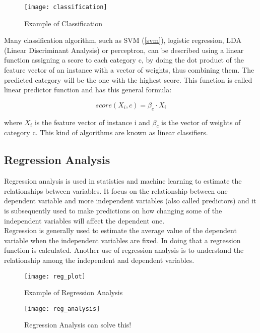 \begin{figure}[H]
	\centering
	\texttt{[image: classification]}
	\caption{Example of Classification \cite{}}
	\label{fig:classification}
\end{figure}	

Many classification algorithm, such as SVM (\ref{svm}), logistic regression, LDA (Linear Discriminant Analysis) or perceptron, can be described using a linear function assigning a score to each category c, by doing the dot product of the feature vector of an instance with a vector of weights, thus combining them. The predicted category will be the one with the highest score. This function is called linear predictor function and has this general formula:

\begin{equation}
score(X_i, c) = \beta_c \cdot X_i
\end{equation}

where $X_i$ is the feature vector of instance i and $\beta_c$ is the vector of weights of category c. This kind of algorithms are known as linear classifiers.

\subsection{Regression Analysis} \label{regression}
Regression analysis is used in statistics and machine learning to estimate the relationships between variables. It focus on the relationship between one dependent variable and more independent variables (also called predictors) and it is subsequently used to make predictions on how changing some of the  independent variables will affect the dependent one. \cite{wiki:linreg} \\
Regression is generally used to estimate the average value of the dependent variable when the independent variables are fixed. In doing that a regression function is calculated. Another use of regression analysis is to understand the relationship among the independent and dependent variables.

\begin{figure}[H]
	\centering
	\texttt{[image: reg\_plot]}
	\caption{Example of Regression Analysis}
	\label{fig:reg_plot}
\end{figure}	

\begin{figure}[H]
	\centering
	\texttt{[image: reg\_analysis]}
	\caption{Regression Analysis can solve this! \cite{reg_analisys}}
	\label{fig:reg_analysis}
\end{figure}

